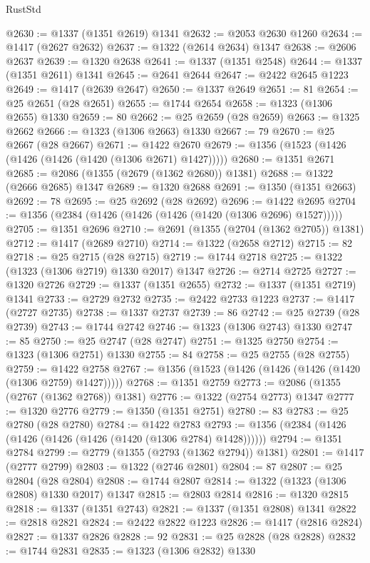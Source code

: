 \begin{lexlean}{RustStd}
\begin{coremodule}
@2630 := @1337 (@1351 @2619) @1341
@2632 := @2053 @2630 @1260
@2634 := @1417 (@2627 @2632)
@2637 := @1322 (@2614 @2634) @1347
@2638 := @2606 @2637
@2639 := @1320 @2638
@2641 := @1337 (@1351 @2548)
@2644 := @1337 (@1351 @2611) @1341
@2645 := @2641 @2644
@2647 := @2422 @2645 @1223
@2649 := @1417 (@2639 @2647)
@2650 := @1337 @2649
@2651 := 81
@2654 := @25 @2651 (@28 @2651)
@2655 := @1744 @2654
@2658 := @1323 (@1306 @2655) @1330
@2659 := 80
@2662 := @25 @2659 (@28 @2659)
@2663 := @1325 @2662
@2666 := @1323 (@1306 @2663) @1330
@2667 := 79
@2670 := @25 @2667 (@28 @2667)
@2671 := @1422 @2670
@2679 := @1356 (@1523 (@1426 (@1426 (@1426 (@1420 (@1306 @2671) @1427)))))
@2680 := @1351 @2671
@2685 := @2086 (@1355 (@2679 (@1362 @2680)) @1381)
@2688 := @1322 (@2666 @2685) @1347
@2689 := @1320 @2688
@2691 := @1350 (@1351 @2663)
@2692 := 78
@2695 := @25 @2692 (@28 @2692)
@2696 := @1422 @2695
@2704 := @1356 (@2384 (@1426 (@1426 (@1426 (@1420 (@1306 @2696) @1527)))))
@2705 := @1351 @2696
@2710 := @2691 (@1355 (@2704 (@1362 @2705)) @1381)
@2712 := @1417 (@2689 @2710)
@2714 := @1322 (@2658 @2712)
@2715 := 82
@2718 := @25 @2715 (@28 @2715)
@2719 := @1744 @2718
@2725 := @1322 (@1323 (@1306 @2719) @1330 @2017) @1347
@2726 := @2714 @2725
@2727 := @1320 @2726
@2729 := @1337 (@1351 @2655)
@2732 := @1337 (@1351 @2719) @1341
@2733 := @2729 @2732
@2735 := @2422 @2733 @1223
@2737 := @1417 (@2727 @2735)
@2738 := @1337 @2737
@2739 := 86
@2742 := @25 @2739 (@28 @2739)
@2743 := @1744 @2742
@2746 := @1323 (@1306 @2743) @1330
@2747 := 85
@2750 := @25 @2747 (@28 @2747)
@2751 := @1325 @2750
@2754 := @1323 (@1306 @2751) @1330
@2755 := 84
@2758 := @25 @2755 (@28 @2755)
@2759 := @1422 @2758
@2767 := @1356 (@1523 (@1426 (@1426 (@1426 (@1420 (@1306 @2759) @1427)))))
@2768 := @1351 @2759
@2773 := @2086 (@1355 (@2767 (@1362 @2768)) @1381)
@2776 := @1322 (@2754 @2773) @1347
@2777 := @1320 @2776
@2779 := @1350 (@1351 @2751)
@2780 := 83
@2783 := @25 @2780 (@28 @2780)
@2784 := @1422 @2783
@2793 := @1356 (@2384 (@1426 (@1426 (@1426 (@1426 (@1420 (@1306 @2784) @1428))))))
@2794 := @1351 @2784
@2799 := @2779 (@1355 (@2793 (@1362 @2794)) @1381)
@2801 := @1417 (@2777 @2799)
@2803 := @1322 (@2746 @2801)
@2804 := 87
@2807 := @25 @2804 (@28 @2804)
@2808 := @1744 @2807
@2814 := @1322 (@1323 (@1306 @2808) @1330 @2017) @1347
@2815 := @2803 @2814
@2816 := @1320 @2815
@2818 := @1337 (@1351 @2743)
@2821 := @1337 (@1351 @2808) @1341
@2822 := @2818 @2821
@2824 := @2422 @2822 @1223
@2826 := @1417 (@2816 @2824)
@2827 := @1337 @2826
@2828 := 92
@2831 := @25 @2828 (@28 @2828)
@2832 := @1744 @2831
@2835 := @1323 (@1306 @2832) @1330

\end{coremodule}
\end{lexlean}

